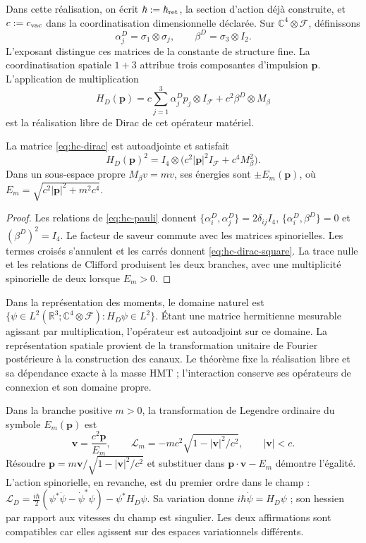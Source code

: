 Dans cette réalisation, on écrit \(\hbar:=\hbar_{\rm ret}\), la section d'action déjà construite, et \(c:=c_{\rm vac}\) dans la coordinatisation dimensionnelle déclarée. Sur \(\mathbb C^4\otimes\mathcal F\), définissons
\[
 \alpha_j^{D}=\sigma_1\otimes\sigma_j,\qquad
 \beta^D=\sigma_3\otimes I_2.
\]
L'exposant distingue ces matrices de la constante de structure fine. La coordinatisation spatiale \(1+3\) attribue trois composantes d'impulsion \(\mathbf p\). L'application de multiplication
\begin{equation}
 H_D(\mathbf p)
 =c\sum_{j=1}^3\alpha_j^Dp_j\otimes I_{\mathcal F}
 +c^2\beta^D\otimes M_\beta
 \label{eq:hc-dirac}
\end{equation}
est la réalisation libre de Dirac de cet opérateur matériel.

\begin{theorem}
\label{thm:hc-dirac-square}
La matrice \eqref{eq:hc-dirac} est autoadjointe et satisfait
\begin{equation}
 H_D(\mathbf p)^2
 =I_4\otimes\bigl(c^2|\mathbf p|^2I_{\mathcal F}
 +c^4M_\beta^2\bigr).
 \label{eq:hc-dirac-square}
\end{equation}
Dans un sous-espace propre \(M_\beta v=m v\), ses énergies sont \(\pm E_m(\mathbf p)\), où \(E_m=\sqrt{c^2|\mathbf p|^2+m^2c^4}\).
\end{theorem}
\begin{proof}
Les relations de \eqref{eq:hc-pauli} donnent
\(\{\alpha_i^D,\alpha_j^D\}=2\delta_{ij}I_4\),
\(\{\alpha_i^D,\beta^D\}=0\) et \((\beta^D)^2=I_4\).
Le facteur de saveur commute avec les matrices spinorielles.
Les termes croisés s’annulent et les carrés donnent
\eqref{eq:hc-dirac-square}. La trace nulle et les relations de Clifford
produisent les deux branches, avec une multiplicité spinorielle de deux lorsque \(E_m>0\).
\end{proof}

Dans la représentation des moments, le domaine naturel est
\(\{\psi\in L^2(\mathbb R^3;\mathbb C^4\otimes\mathcal F):
H_D\psi\in L^2\}\). Étant une matrice hermitienne mesurable agissant
par multiplication, l’opérateur est autoadjoint sur ce domaine. La
représentation spatiale provient de la transformation unitaire de Fourier
postérieure à la construction des canaux. Le théorème fixe la réalisation
libre et sa dépendance exacte à la masse HMT ; l’interaction conserve ses
opérateurs de connexion et son domaine propre.

Dans la branche positive \(m>0\), la transformation de Legendre ordinaire du symbole \(E_m(\mathbf p)\) est
\[
 \mathbf v=\frac{c^2\mathbf p}{E_m},\qquad
 \mathcal L_m=-mc^2\sqrt{1-|\mathbf v|^2/c^2},
 \qquad |\mathbf v|<c.
\]
Résoudre \(\mathbf p=m\mathbf v/\sqrt{1-|\mathbf v|^2/c^2}\) et substituer dans \(\mathbf p\cdot\mathbf v-E_m\) démontre l'égalité. L'action spinorielle, en revanche, est du premier ordre dans le champ : \(\mathcal L_D=\frac{i\hbar}{2}(\psi^*\dot\psi-\dot\psi^*\psi)
-\psi^*H_D\psi\). Sa variation donne \(i\hbar\dot\psi=H_D\psi\) ; son hessien par rapport aux vitesses du champ est singulier. Les deux affirmations sont compatibles car elles agissent sur des espaces variationnels différents.

